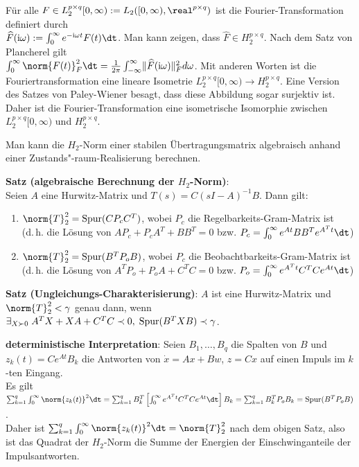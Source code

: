 Für alle $F \in L_2^{p \times q}[0, \infty) := L_2([0, \infty), \real^{p \times q})$ ist die
Fourier-Transformation definiert durch\\
$\widehat{F}(\iu\omega) := \int_0^\infty e^{-\iu\omega t} F(t)\dt$.
Man kann zeigen, dass $\widehat{F} \in H_2^{p \times q}$.
Nach dem Satz von Plancherel gilt\\
$\int_0^\infty \norm{F(t)}_F^2 \dt =
\frac{1}{2\pi} \int_{-\infty}^\infty \lVert\widehat{F}(\iu\omega)\rVert_F^2 d\omega$.
Mit anderen Worten ist die Fouriertransformation eine lineare Isometrie
$L_2^{p \times q}[0, \infty) \rightarrow H_2^{p \times q}$.
Eine Version des Satzes von Paley-Wiener besagt, dass diese Abbildung sogar surjektiv ist.
Daher ist die Fourier-Transformation eine isometrische Isomorphie zwischen
$L_2^{p \times q}[0, \infty)$ und $H_2^{p \times q}$.

\linie

Man kann die $H_2$-Norm einer stabilen Übertragungsmatrix algebraisch anhand einer
Zustands"-raum-Realisierung berechnen.

\textbf{Satz (algebraische Berechnung der $H_2$-Norm)}:\\
Seien $A$ eine Hurwitz-Matrix und $T(s) = C(sI - A)^{-1}B$.
Dann gilt:
\begin{enumerate}
    \item
    $\norm{T}_2^2 = \Spur(C P_c C^T)$, wobei
    $P_c$ die Regelbarkeits-Gram-Matrix ist\\
    (d.\,h. die Lösung von $AP_c + P_c A^T + BB^T = 0$
    bzw. $P_c = \int_0^\infty e^{At} B B^T e^{A^T t} \dt$)

    \item
    $\norm{T}_2^2 = \Spur(B^T P_o B)$, wobei
    $P_c$ die Beobachtbarkeits-Gram-Matrix ist\\
    (d.\,h. die Lösung von $A^T P_o + P_o A + C^T C = 0$
    bzw. $P_o = \int_0^\infty e^{A^T t} C^T C e^{At} \dt$)
\end{enumerate}

\textbf{Satz (Ungleichungs-Charakterisierung)}:
$A$ ist eine Hurwitz-Matrix und $\norm{T}_2^2 < \gamma$ genau dann, wenn
$\exists_{X \succ 0}\; A^T X + XA + C^T C \prec 0,\; \operatorname{Spur}(B^T X B) \prec \gamma$.

\linie

\textbf{deterministische Interpretation}:
Seien $B_1, \dotsc, B_q$ die Spalten von $B$ und $z_k(t) = Ce^{At} B_k$ die Antworten
von $\dot{x} = Ax + Bw$, $z = Cx$ auf einen Impuls im $k$-ten Eingang.\\
Es gilt
$\sum_{k=1}^q \int_0^\infty \norm{z_k(t)}^2 \dt
= \sum_{k=1}^q B_k^T \left[\int_0^\infty e^{A^T t} C^T C e^{At} \dt\right] B_k
= \sum_{k=1}^q B_k^T P_o B_k
= \Spur(B^T P_o B)$.\\
Daher ist $\sum_{k=1}^q \int_0^\infty \norm{z_k(t)}^2 \dt = \norm{T}_2^2$ nach dem obigen Satz,
also ist das Quadrat der
$H_2$-Norm die Summe der Energien der Einschwinganteile der Impulsantworten.


